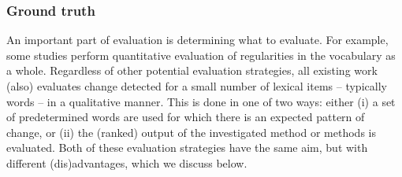 \documentclass[output=paper]{langscibook}
\begin{document}
\subsubsection{Ground truth}
\label{subsec:groundtruth}
An important part of evaluation is determining what to evaluate. 
For example, some studies perform quantitative evaluation of regularities in the vocabulary as a whole.
Regardless of other potential evaluation strategies, all existing work (also) evaluates change detected for a small number of lexical items -- typically words -- in a qualitative manner. 
This is done in one of two ways: either (i) a set of predetermined words are used for which there is an expected pattern of change, or (ii) the (ranked) output of the investigated method or methods is evaluated. Both of these evaluation strategies have the same aim, but with different (dis)advantages, which we discuss below. 
\end{document}
